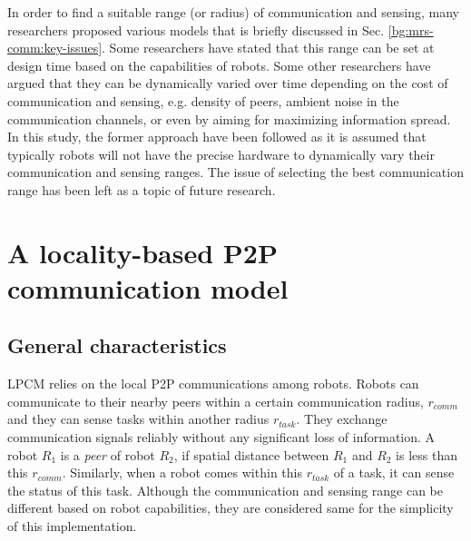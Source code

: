 In order to find a suitable  range (or radius) of communication and sensing,  many researchers proposed various models that is briefly discussed in Sec. \ref{bg:mrs-comm:key-issues}. Some researchers have stated that this range can be set at design time based on the capabilities of robots. Some other researchers have argued that they can be dynamically varied over time depending on the  cost of communication and sensing, e.g. density of peers, ambient noise in the communication channels, or even by aiming for maximizing information spread. In this study,  the former approach have been followed as it is assumed that typically robots will not have the precise hardware to dynamically vary their communication and sensing ranges. The issue of selecting the best communication range  has been left as a topic of future research.
\section{A locality-based P2P communication model}
\label{local-comm:model}
\subsection{General characteristics}
LPCM relies on the local P2P communications among robots. Robots can communicate to their nearby peers within a certain communication radius, $r_{comm}$ and they can sense tasks within another radius $r_{task}$. They exchange communication signals reliably without any significant loss of information. A robot $R_1$ is a {\em peer} of robot $R_2$, if spatial distance between $R_1$ and $R_2$ is less than this $r_{comm}$.
Similarly, when a robot comes within this $r_{task}$ of a task, it can sense the status of this task. Although the communication and sensing  range can be different based on robot capabilities,   they are considered same for the simplicity of this implementation.

